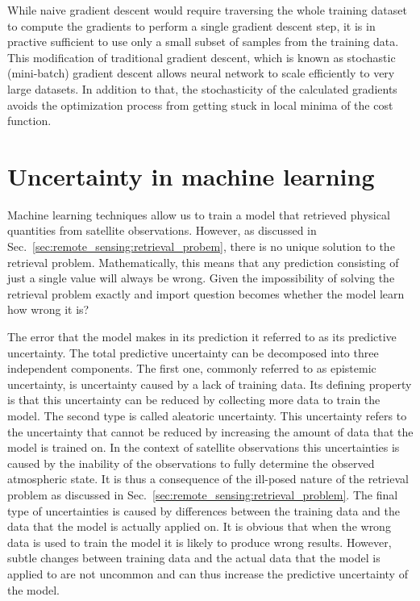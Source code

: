 \begin{description}
While naive gradient descent would require traversing the whole training dataset
to compute the gradients to perform a single gradient descent step, it is in
practive sufficient to use only a small subset of samples from the training
data. This modification of traditional gradient descent, which is known as
stochastic (mini-batch) gradient descent allows neural network to scale
efficiently to very large datasets. In addition to that, the stochasticity of
the calculated gradients avoids the optimization process from getting stuck in
local minima of the cost function.


\section{Uncertainty in machine learning}


Machine learning techniques allow us to train a model that retrieved physical
quantities from satellite observations. However, as discussed in
Sec.~\ref{sec:remote_sensing:retrieval_probem}, there is no unique solution to
the retrieval problem. Mathematically, this means that any prediction consisting
of just a single value will always be wrong. Given the impossibility of solving
the retrieval problem exactly and import question becomes whether the model
learn how wrong it is?

The error that the model makes in its prediction it referred to as its
predictive uncertainty. The total predictive uncertainty can be decomposed into
three independent components. The first one, commonly referred to as epistemic
uncertainty, is uncertainty caused by a lack of training data. Its defining
property is that this uncertainty can be reduced by collecting more data to
train the model. The second type is called aleatoric uncertainty. This
uncertainty refers to the uncertainty that cannot be reduced by increasing the
amount of data that the model is trained on. In the context of satellite
observations this uncertainties is caused by the inability of the observations
to fully determine the observed atmospheric state. It is thus a consequence of
the ill-posed nature of the retrieval problem as discussed in
Sec.~\ref{sec:remote_sensing:retrieval_problem}. The final type of uncertainties
is caused by differences between the training data and the data that the model
is actually applied on. It is obvious that when the wrong data is used to train
the model it is likely to produce wrong results. However, subtle changes between
training data and the actual data that the model is applied to are not uncommon
and can thus increase the predictive uncertainty of the model.



\end{description}
